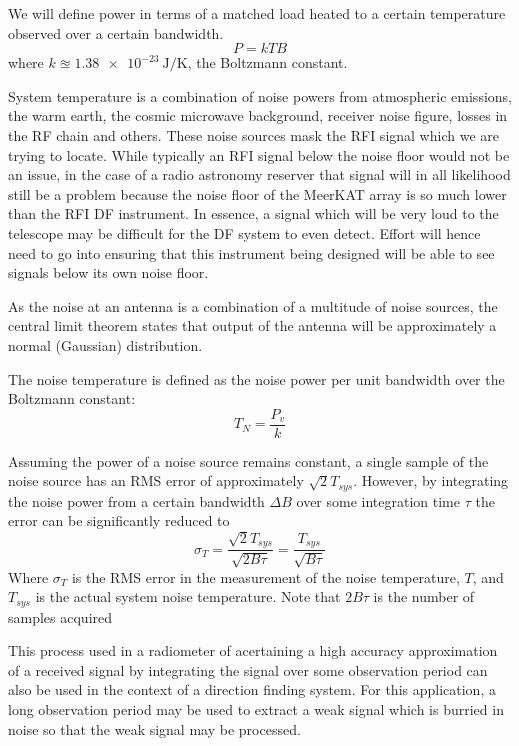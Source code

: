 We will define power in terms of a matched load heated to a certain temperature observed over a certain bandwidth.
\begin{equation}
  P = kTB
\end{equation}
where \(k \approxeq \SI{1.38e-23}{\joule\per\kelvin}\), the Boltzmann constant. 

System temperature is a combination of noise powers from atmospheric emissions, the warm earth, the cosmic microwave background, receiver noise figure, losses in the RF chain and others. These noise sources mask the RFI signal which we are trying to locate. While typically an RFI signal below the noise floor would not be an issue, in the case of a radio astronomy reserver that signal will in all likelihood still be a problem because the noise floor of the MeerKAT array is so much lower than the RFI DF instrument. In essence, a signal which will be very loud to the telescope may be difficult for the DF system to even detect. Effort will hence need to go into ensuring that this instrument being designed will be able to see signals below its own noise floor. 

As the noise at an antenna is a combination of a multitude of noise sources, the central limit theorem states that output of the antenna will be approximately a normal (Gaussian) distribution. 

The noise temperature is defined as the noise power per unit bandwidth over the Boltzmann constant:
\begin{equation}
  T_N = \frac{P_v}{k}
\end{equation}

Assuming the power of a noise source remains constant, a single sample of the noise source has an RMS error of approximately \(\sqrt{2}T_{sys}\). However, by integrating the noise power from a certain bandwidth \(\Delta B\) over some integration time \(\tau\) the error can be significantly reduced to
\begin{equation}
  \sigma_{T} = \frac{\sqrt{2}T_{sys}}{\sqrt{2B\tau}} = \frac{T_{sys}}{\sqrt{B \tau}}
\end{equation}
Where \(\sigma_{T}\) is the RMS error in the measurement of the noise temperature, \(T\), and \(T_{sys}\) is the actual system noise temperature. Note that \(2B\tau\) is the number of samples acquired

This process used in a radiometer of acertaining a high accuracy approximation of a received signal by integrating the signal over some observation period can also be used in the context of a direction finding system. For this application, a long observation period may be used to extract a weak signal which is burried in noise so that the weak signal may be processed.

